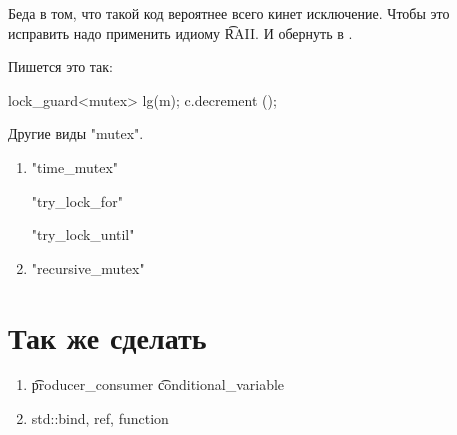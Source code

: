 Беда в том, что такой код вероятнее всего кинет исключение.
Чтобы это исправить надо применить идиому \t{RAII}.
И обернуть  в .

Пишется это так:
\begin{cppcode}
lock_guard<mutex> lg(m);
c.decrement ();
\end{cppcode}


Другие виды \cpp"mutex".
\begin{enumerate}
\item
\cpp"time_mutex"

\cpp"try_lock_for"

\cpp"try_lock_until"
\item
\cpp"recursive_mutex"

\end{enumerate}


\section{Так же сделать}
\begin{enumerate}
\item
\t{producer\_consumer}
\t{conditional\_variable}
\item
std::bind, ref, function

\end{enumerate}